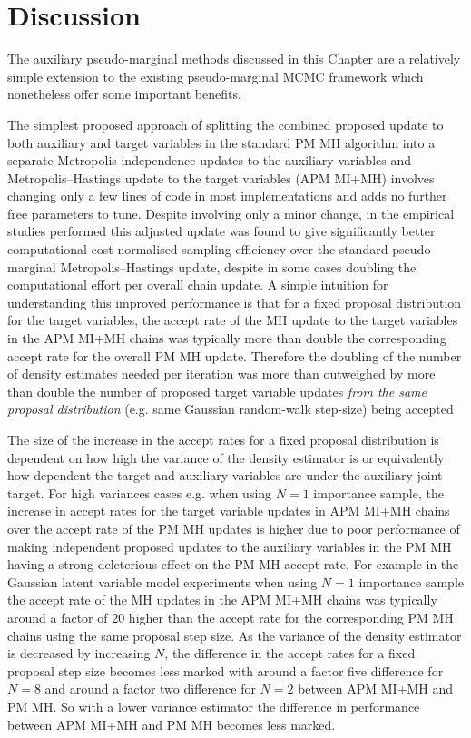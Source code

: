 \section{Discussion}

The auxiliary pseudo-marginal methods discussed in this Chapter are a relatively simple extension to the existing pseudo-marginal \ac{MCMC} framework which nonetheless offer some important benefits. 

The simplest proposed approach of splitting the combined proposed update to both auxiliary and target variables in the standard \ac{PM} \ac{MH} algorithm into a separate Metropolis independence updates to the auxiliary variables and Metropolis--Hastings update to the target variables (\ac{APM} \ac{MI}+\ac{MH}) involves changing only a few lines of code in most implementations and adds no further free parameters to tune. Despite involving only a minor change, in the empirical studies performed this adjusted update was found to give significantly better computational cost normalised sampling efficiency over the standard pseudo-marginal Metropolis--Hastings update, despite in some cases doubling the computational effort per overall chain update. A simple intuition for understanding this improved performance is that for a fixed proposal distribution for the target variables, the accept rate of the \ac{MH} update to the target variables in the \ac{APM} \ac{MI}+\ac{MH} chains was typically more than double the corresponding accept rate for the overall \ac{PM} \ac{MH} update. Therefore the doubling of the number of density estimates needed per iteration was more than outweighed by more than double the number of proposed target variable updates \emph{from the same proposal distribution} (e.g. same Gaussian random-walk step-size) being accepted

The size of the increase in the accept rates for a fixed proposal distribution is dependent on how high the variance of the density estimator is or equivalently how dependent the target and auxiliary variables are under the auxiliary joint target. For high variances cases e.g. when using $N=1$ importance sample, the increase in accept rates for the target variable updates in \ac{APM} \ac{MI}+\ac{MH} chains over the accept rate of the \ac{PM} \ac{MH} updates is higher due to poor performance of making independent proposed updates to the auxiliary variables in the \ac{PM} \ac{MH} having a strong deleterious effect on the \ac{PM} \ac{MH} accept rate. For example in the Gaussian latent variable model experiments when using $N=1$ importance sample the accept rate of the \ac{MH} updates in the \ac{APM} \ac{MI}+\ac{MH} chains was typically around a factor of 20 higher than the accept rate for the corresponding \ac{PM} \ac{MH} chains using the same proposal step size. As the variance of the density estimator is decreased by increasing $N$, the difference in the accept rates for a fixed proposal step size becomes less marked with around a factor five difference for $N=8$ and around a factor two difference for $N=2$ between \ac{APM} \ac{MI}+\ac{MH} and \ac{PM} \ac{MH}. So with a lower variance estimator the difference in performance between \ac{APM} \ac{MI}+\ac{MH} and \ac{PM} \ac{MH} becomes less marked. 

